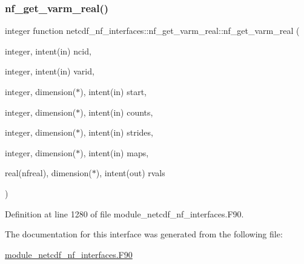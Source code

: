 \subsubsection{\texorpdfstring{nf\+\_\+get\+\_\+varm\+\_\+real()}{nf\_get\_varm\_real()}}
{\footnotesize\ttfamily integer function netcdf\+\_\+nf\+\_\+interfaces\+::nf\+\_\+get\+\_\+varm\+\_\+real\+::nf\+\_\+get\+\_\+varm\+\_\+real (\begin{DoxyParamCaption}\item[{integer, intent(in)}]{ncid,  }\item[{integer, intent(in)}]{varid,  }\item[{integer, dimension($\ast$), intent(in)}]{start,  }\item[{integer, dimension($\ast$), intent(in)}]{counts,  }\item[{integer, dimension($\ast$), intent(in)}]{strides,  }\item[{integer, dimension($\ast$), intent(in)}]{maps,  }\item[{real(nfreal), dimension($\ast$), intent(out)}]{rvals }\end{DoxyParamCaption})}



Definition at line 1280 of file module\+\_\+netcdf\+\_\+nf\+\_\+interfaces.\+F90.



The documentation for this interface was generated from the following file\+:\begin{DoxyCompactItemize}
\item 
\hyperlink{module__netcdf__nf__interfaces_8F90}{module\+\_\+netcdf\+\_\+nf\+\_\+interfaces.\+F90}\end{DoxyCompactItemize}
